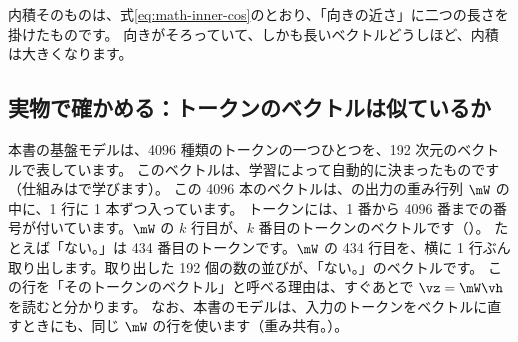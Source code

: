 内積そのものは、式\eqref{eq:math-inner-cos}のとおり、「向きの近さ」に二つの長さを掛けたものです。
向きがそろっていて、しかも長いベクトルどうしほど、内積は大きくなります。

\subsection*{実物で確かめる：トークンのベクトルは似ているか}

本書の基盤モデルは、4096 種類のトークンの一つひとつを、192 次元のベクトルで表しています。
このベクトルは、学習によって自動的に決まったものです（仕組みはで学びます）。
この 4096 本のベクトルは、の出力の重み行列 $\mW$ の中に、1 行に 1 本ずつ入っています。
トークンには、1 番から 4096 番までの番号が付いています。$\mW$ の $k$ 行目が、$k$ 番目のトークンのベクトルです（）。
たとえば「ない。」は 434 番目のトークンです。$\mW$ の 434 行目を、横に 1 行ぶん取り出します。取り出した 192 個の数の並びが、「ない。」のベクトルです。
この行を「そのトークンのベクトル」と呼べる理由は、すぐあとで $\vz=\mW\vh$ を読むと分かります。
なお、本書のモデルは、入力のトークンをベクトルに直すときにも、同じ $\mW$ の行を使います（重み共有。）。

